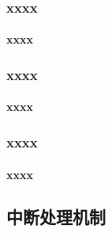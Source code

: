 % 
% 
% 
\begin{frame}
	\frametitle{xxxx}
	\framesubtitle{xxxx}
\end{frame}
% 
\begin{frame}
	\frametitle{xxxx}
	\framesubtitle{xxxx}
\end{frame}
% 
% 
% 
\begin{frame}
	\frametitle{xxxx}
	\framesubtitle{xxxx}
\end{frame}
% 

\subsection{中断处理机制}

